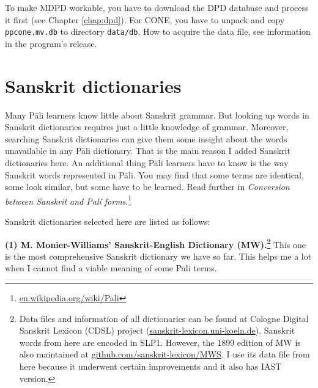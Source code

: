 
To make MDPD workable, you have to download the DPD database and process it first (see Chapter \ref{chap:dpd}). For CONE, you have to unpack and copy \texttt{ppcone.mv.db} to directory \texttt{data/db}. How to acquire the data file, see information in the program's release.

\section{Sanskrit dictionaries}

Many Pāli learners know little about Sanskrit grammar. But looking up words in Sanskrit dictionaries requires just a little knowledge of grammar. Moreover, searching Sanskrit dictionaries can give them some insight about the words unavailable in any Pāli dictionary. That is the main reason I added Sanskrit dictionaries here. An additional thing Pāli learners have to know is the way Sanskrit words represented in Pāli. You may find that some terms are identical, some look similar, but some have to be learned. Read further in \emph{Conversion between Sanskrit and Pali forms}.\footnote{\url{en.wikipedia.org/wiki/Pali}}

Sanskrit dictionaries selected here are listed as follows:

\textbf{(1) M. Monier-Williams' Sanskrit-English Dictionary (MW).}\footnote{Data files and information of all dictionaries can be found at Cologne Digital Sanskrit Lexicon (CDSL) project (\url{sanskrit-lexicon.uni-koeln.de}). Sanskrit words from here are encoded in SLP1. However, the 1899 edition of MW is also maintained at \url{github.com/sanskrit-lexicon/MWS}. I use its data file from here because it underwent certain improvements and it also has IAST version.} This one is the most comprehensive Sanskrit dictionary we have so far. This helps me a lot when I cannot find a viable meaning of some Pāli terms.

